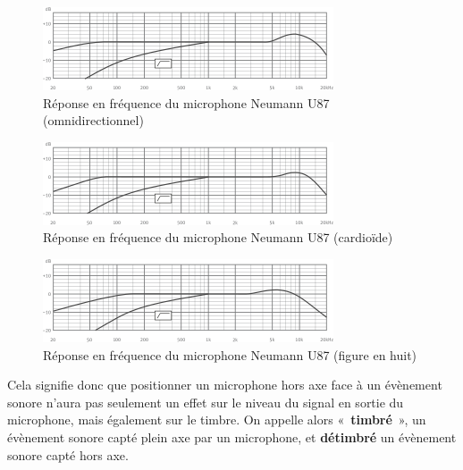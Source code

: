 \documentclass[
]{book}
\begin{document}
\begin{figure}

{\centering \includegraphics[width=0.66\linewidth]{_resources/diagrams/Frequency-diagram-U-87-Ai-omni} 

}

\caption{Réponse en fréquence du microphone  Neumann U87 (omnidirectionnel)}\label{fig:unnamed-chunk-26}
\end{figure}
\begin{figure}

{\centering \includegraphics[width=0.66\linewidth]{_resources/diagrams/Frequency-diagram-U-87-Ai-cardioid} 

}

\caption{Réponse en fréquence du microphone Neumann U87 (cardioïde)}\label{fig:unnamed-chunk-27}
\end{figure}
\begin{figure}

{\centering \includegraphics[width=0.66\linewidth]{_resources/diagrams/Frequency-diagram-U-87-Ai-figure8} 

}

\caption{Réponse en fréquence du microphone Neumann U87 (figure en huit)}\label{fig:unnamed-chunk-28}
\end{figure}

Cela signifie donc que positionner un microphone hors axe face à un évènement sonore n'aura pas seulement un effet sur le niveau du signal en sortie du microphone, mais également sur le timbre. On appelle alors «~\textbf{timbré}~», un évènement sonore capté plein axe par un microphone, et \textbf{détimbré} un évènement sonore capté hors axe.
\end{document}
